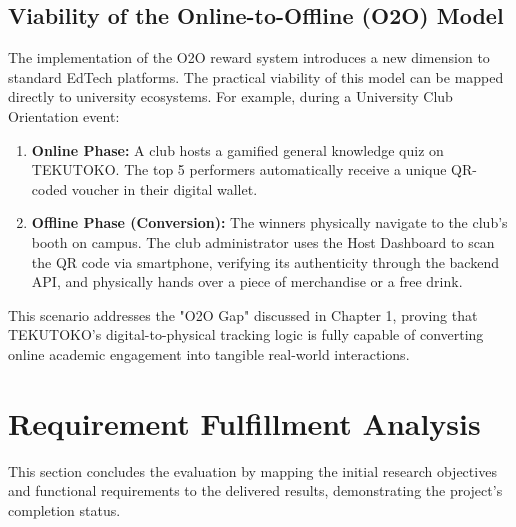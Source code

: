 \subsection{Viability of the Online-to-Offline (O2O) Model}
The implementation of the O2O reward system introduces a new dimension to standard EdTech platforms. The practical viability of this model can be mapped directly to university ecosystems. For example, during a University Club Orientation event:
\begin{enumerate}
    \item \textbf{Online Phase:} A club hosts a gamified general knowledge quiz on TEKUTOKO. The top 5 performers automatically receive a unique QR-coded voucher in their digital wallet.
    \item \textbf{Offline Phase (Conversion):} The winners physically navigate to the club's booth on campus. The club administrator uses the Host Dashboard to scan the QR code via smartphone, verifying its authenticity through the backend API, and physically hands over a piece of merchandise or a free drink.
\end{enumerate}
This scenario addresses the "O2O Gap" discussed in Chapter 1, proving that TEKUTOKO's digital-to-physical tracking logic is fully capable of converting online academic engagement into tangible real-world interactions.

\section{Requirement Fulfillment Analysis}
\label{sec:requirement-fulfillment}

This section concludes the evaluation by mapping the initial research objectives and functional requirements to the delivered results, demonstrating the project's completion status.

